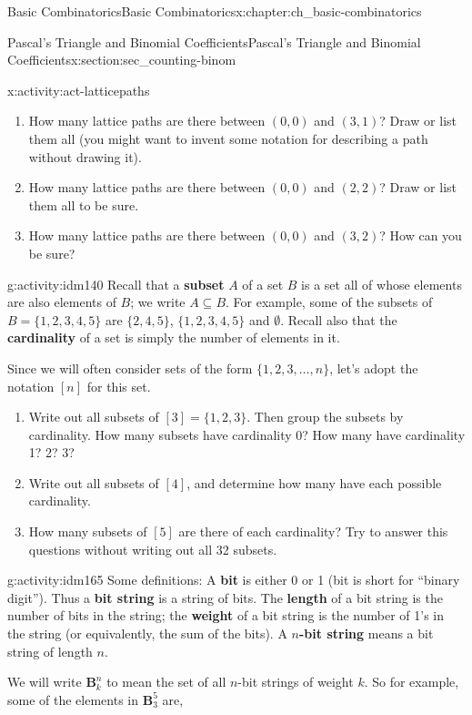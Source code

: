 \documentclass[oneside,10pt,]{book}
\newcommand{\terminology}[1]{\textbf{#1}}
\numberwithin{equation}{chapter}
\def\B{\mathbf{B}}
\begin{document}
\begin{chapterptx}{Basic Combinatorics}{}{Basic Combinatorics}{}{}{x:chapter:ch_basic-combinatorics}
\begin{sectionptx}{Pascal's Triangle and Binomial Coefficients}{}{Pascal's Triangle and Binomial Coefficients}{}{}{x:section:sec_counting-binom}
\begin{activity}{}{x:activity:act-latticepaths}
\begin{enumerate}[font=\bfseries,label=(\alph*),ref=\alph*]
\item{}How many lattice paths are there between \((0,0)\) and \((3,1)\)?  Draw or list them all (you might want to invent some notation for describing a path without drawing it).%
\item{}How many lattice paths are there between \((0,0)\) and \((2,2)\)? Draw or list them all to be sure.%
\item{}How many lattice paths are there between \((0,0)\) and \((3,2)\)? How can you be sure?%
\end{enumerate}
\end{activity}
\begin{activity}{}{g:activity:idm140}%
Recall that a \terminology{subset} \(A\) of a set \(B\) is a set all of whose elements are also elements of \(B\); we write \(A \subseteq B\).  For example, some of the subsets of \(B = \{1,2,3,4,5\}\) are \(\{2,4,5\}\), \(\{1,2,3,4,5\}\) and \(\emptyset\).  Recall also that the \terminology{cardinality} of a set is simply the number of elements in it.%
\par
Since we will often consider sets of the form \(\{1,2,3,\ldots,n\}\), let's adopt the notation \([n]\) for this set.%
\begin{enumerate}[font=\bfseries,label=(\alph*),ref=\alph*]
\item{}Write out all subsets of \([3] = \{1,2,3\}\).  Then group the subsets by cardinality.  How many subsets have cardinality 0?  How many have cardinality 1?  2? 3?%
\item{}Write out all subsets of \([4]\), and determine how many have each possible cardinality.%
\item{}How many subsets of \([5]\) are there of each cardinality?  Try to answer this questions without writing out all 32 subsets.%
\end{enumerate}
\end{activity}
\begin{activity}{}{g:activity:idm165}%
Some definitions: A \terminology{bit} is either 0 or 1 (bit is short for ``binary digit'').  Thus a \terminology{bit string} is a string of bits.  The \terminology{length} of a bit string is the number of bits in the string; the \terminology{weight} of a bit string is the number of 1's in the string (or equivalently, the sum of the bits). A \terminology{\(n\)-bit string} means a bit string of length \(n\).%
\par
We will write \(\B^n_k\) to mean the set of all \(n\)-bit strings of weight \(k\).  So for example, some of the elements in \(\B^5_3\) are,%

\end{activity}
\end{sectionptx}
\end{chapterptx}
\end{document}
